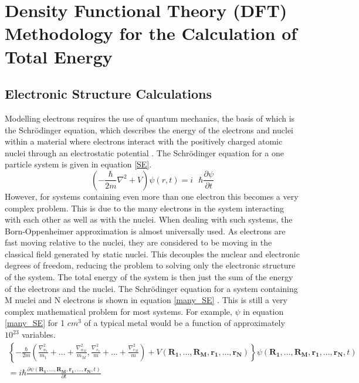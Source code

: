 \chapter{Density Functional Theory (DFT) Methodology for the Calculation of Total Energy}\label{DFT_methods}

\section*{Electronic Structure Calculations}
Modelling electrons requires the use of quantum mechanics, the basis of which is the 
Schr{\"o}dinger equation, which describes the energy of the electrons and nuclei within a material where electrons interact with the positively charged atomic nuclei through an electrostatic potential \cite{Lesar}. The Schr{\"o}dinger equation for a one particle system is given in equation \ref{SE}.
\begin{equation} \label{SE}
\left( - \frac{\hbar}{2m} \nabla^2 + \hat{V} \right)\psi(r,t) = i\text{ } \hbar\frac{\partial \psi}{\partial t}
\end{equation}
However, for systems containing even more than one electron this becomes a very complex problem. This is due to the many electrons in the system interacting with each other as well as with the nuclei. When dealing with such systems, the Born-Oppenheimer approximation is almost universally used. As electrons are fast moving relative to the nuclei, they are considered to be moving in the classical field generated by static nuclei. This decouples the nuclear and electronic degrees of freedom, reducing the problem to solving only the electronic structure of the system. The total energy of the system is then just the sum of the energy of the electrons and the nuclei. The Schr{\"o}dinger equation for a system containing M nuclei and N electrons is shown in equation \ref{many_SE} \cite{Lesar}. This is still a very complex mathematical problem for most systems. For example, $\psi$ in equation \ref{many_SE} for 1 $cm^3$ of a typical metal would be a function of approximately $10^{23}$ variables.
\begin{multline}  \label{many_SE}
\left\{ - \frac{\hbar}{2m} \left( \frac{\nabla_{n_1}^2}{m_1} + ... + \frac{\nabla_{n_M}^2}{m_M}, 
\frac{\nabla_{e_1}^2}{m} + ... + \frac{\nabla_{e_M}^2}{m} \right)
+ V \left( \mathbf{R_1},...,\mathbf{R_M}, \mathbf{r_1}, ..., \mathbf{r_N} \right)
\right\}
\psi (\mathbf{R_1},...,\mathbf{R_M}, \mathbf{r_1}, ..., \mathbf{r_N}, t) \\
= i\hbar \frac{\partial\psi(\mathbf{R_1},...,\mathbf{R_M}, \mathbf{r_1}, ..., \mathbf{r_N},t)}{\partial t}
\end{multline}

